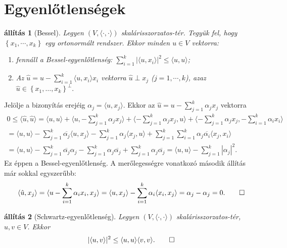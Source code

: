 \documentclass[9pt, a4paper, showtrims]{memoir}
\makeatletter
\renewenvironment{proof}[1][\proofname]
    {\par\pushQED{\qed}%
    \normalfont \topsep6\p@\@plus6\p@\relax
    \trivlist
    \item[\hskip\labelsep
        \itshape
    #1\@addpunct{:}]\ignorespaces}
    {\popQED\endtrivlist\@endpefalse}
\theoremstyle{plain}
\newtheorem{proposition}{állítás}[chapter]
\theoremstyle{remark}
\theoremstyle{definition}
\DeclareMathOperator{\lin}{lin}
\newcommand{\ip}[2]{\langle#1,#2\rangle}
\makeatother
\begin{document}
\section{Egyenlőtlenségek}
\begin{proposition}[Bessel]\label{pr:Bessel}
	Legyen $\left( V,\ip{\cdot}{\cdot} \right)$ skalárisszorzatos-tér.
	Tegyük fel, hogy $\left\{ x_1,\cdots,x_k \right\}$ egy ortonormált rendszer.
	Ekkor minden $u\in V$ vektorra:
	\begin{enumerate}
		\item
		      fennáll a  \emph{Bessel-egyenlőtlenség:}
		      $\sum_{i=1}^k|\ip{u}{x_i}|^2\leq\ip{u}{u}$;
		\item
		      Az
		      \(
		      \hat{u}=u-\sum_{i=1}^k\ip{u}{x_i}x_i
		      \)
		      vektorra $\hat{u}\perp x_j$
		      ($j=1,\cdots,k$), azaz
		      \(
		      \hat{u}\in
		      \left\{ x_1,\ldots,x_k \right\}^\perp
		      .
		      \)
		      \qedhere
	\end{enumerate}
\end{proposition}
\begin{proof}
	Jelölje a bizonyítás erejéig
	\begin{math}
		\alpha_j=\ip{u}{x_j}.
	\end{math}
	Ekkor az $\hat{u}=u-\sum_{j=1}^k\alpha_jx_j$ vektorra
	\begin{multline*}
		0
		\leq
		\ip{\hat{u}}{\hat{u}}
		=
		\ip{u}{u}+\ip{u}{-\sum_{j=1}^k\alpha_jx_j}+\ip{-\sum_{j=1}^k\alpha_jx_j}{u}+\ip{-\sum_{j=1}^k\alpha_jx_j}{-\sum_{i=1}^k\alpha_ix_i}
		\\
		=
		\ip{u}{u}-\sum_{j=1}^k\overline{\alpha_j}\ip{u}{x_j}-\sum_{j=1}^k\alpha_j\ip{x_j}{u}+\sum_{j=1}^k\sum_{i=1}^k\alpha_j\overline{\alpha_i}\ip{x_j}{x_i}
		\\
		=
		\ip{u}{u}-\sum_{j=1}^k\overline{\alpha_j}\alpha_j-\sum_{j=1}^k\alpha_j\overline{\alpha_j}+\sum_{j=1}^k\alpha_j\overline{\alpha_j}
		=\ip{u}{u}-\sum_{j=1}^k|\alpha_j|^2.
	\end{multline*}
	Ez éppen a Bessel-egyenlőtlenség.
	A merőlegességre vonatkozó második állítás már sokkal egyszerűbb:
	\[
		\ip{\hat{u}}{x_j}
		=
		\ip{u-\sum_{i=1}^k\alpha_ix_i}{x_j}
		=
		\ip{u}{x_j}-\sum_{i=1}^k\alpha_i\ip{x_i}{x_j}
		=
		\alpha_j-\alpha_j
		=
		0.
		\qedhere
	\]
\end{proof}
\begin{proposition}[Schwartz-egyenlőtlenség]
	Legyen $\left( V,\ip{\cdot}{\cdot} \right)$ skalárisszorzatos-tér,
	$u,v\in V$.
	Ekkor
	\[
		|\ip{u}{v}|^2\leq \ip{u}{u}\ip{v}{v}.\qedhere
	\]
\end{proposition}
\end{document}

